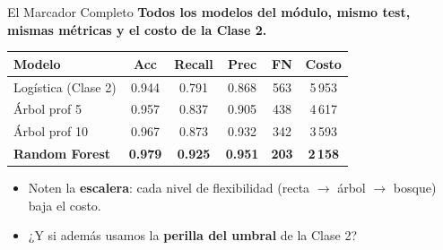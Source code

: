 \documentclass[aspectratio=169, 11pt]{beamer}
\begin{document}
\begin{frame}[shrink=10]{El Marcador Completo}
  \vspace{-4pt}
  {\small\color{arcaDark}\bfseries
    Todos los modelos del módulo, mismo test, mismas métricas y el costo de la Clase 2.}

  \vspace{6pt}
  \centering
  {\footnotesize
  \renewcommand{\arraystretch}{1.5}
  \begin{tabular}{@{}l c c c c c@{}}
    \toprule
    {\bfseries\color{arcaDark} Modelo} & {\bfseries\color{arcaDark} Acc} & {\bfseries\color{arcaDark} Recall}
      & {\bfseries\color{arcaDark} Prec} & {\bfseries\color{arcaDark} FN} & {\bfseries\color{arcaDark} Costo} \\
    \midrule
    \rowcolor{arcaGray}
    Logística (Clase 2) & 0.944 & 0.791 & 0.868 & 563 & 5\,953 \\
    Árbol prof 5 & 0.957 & 0.837 & 0.905 & 438 & 4\,617 \\
    \rowcolor{arcaGray}
    Árbol prof 10 & 0.967 & 0.873 & 0.932 & 342 & 3\,593 \\
    \textbf{Random Forest} & \textbf{0.979} & \textbf{0.925} & \textbf{0.951} & \textbf{203} & \textbf{2\,158} \\
    \bottomrule
  \end{tabular}
  }

  \vspace{8pt}
  {\footnotesize\color{textMuted}
  \begin{itemize}\setlength{\itemsep}{4pt}
    \item[{\color{arcaRed}\scriptsize\faArrowRight}]
      Noten la \textbf{escalera}: cada nivel de flexibilidad (recta \(\to\) árbol
      \(\to\) bosque) baja el costo.
    \item[{\color{arcaRed}\scriptsize\faQuestion}]
      ¿Y si además usamos la \textbf{perilla del umbral} de la Clase 2?
  \end{itemize}
  }
\end{frame}
\end{document}
